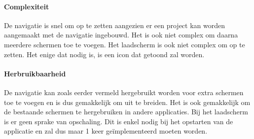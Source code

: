 \paragraph{Complexiteit}
De navigatie is snel om op te zetten aangezien er een project kan worden aangemaakt met de navigatie ingebouwd.
Het is ook niet complex om daarna meerdere schermen toe te voegen. 
Het laadscherm is ook niet complex om op te zetten. Het enige dat nodig is, is een icon dat getoond zal worden.

\paragraph{Herbruikbaarheid}
De navigatie kan zoals eerder vermeld hergebruikt worden voor extra schermen toe te voegen en is dus gemakkelijk 
om uit te breiden. Het is ook gemakkelijk om de bestaande schermen te hergebruiken in andere applicaties. 
Bij het laadscherm is er geen sprake van opschaling. Dit is enkel nodig bij het opstarten 
van de applicatie en zal dus maar 1 keer geïmplementeerd moeten worden.
